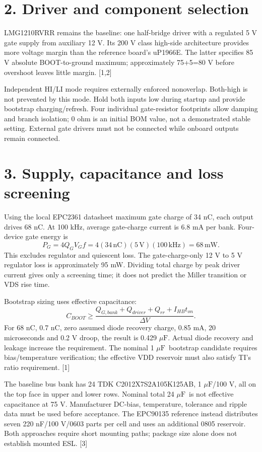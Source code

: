 \documentclass[10pt,a4paper]{article}
\newcommand{\uF}{\ensuremath{\mu\mathrm{F}}}
\begin{document}
\section*{2. Driver and component selection}
LMG1210RVRR remains the baseline: one half-bridge driver with a regulated 5 V gate supply from auxiliary 12 V. Its 200 V class high-side architecture provides more voltage margin than the reference board's uP1966E. The latter specifies 85 V absolute BOOT-to-ground maximum; approximately 75+5=80 V before overshoot leaves little margin. [1,2]

Independent HI/LI mode requires externally enforced nonoverlap. Both-high is not prevented by this mode. Hold both inputs low during startup and provide bootstrap charging/refresh. Four individual gate-resistor footprints allow damping and branch isolation; 0 ohm is an initial BOM value, not a demonstrated stable setting. External gate drivers must not be connected while onboard outputs remain connected.
\newpage
\section*{3. Supply, capacitance and loss screening}
Using the local EPC2361 datasheet maximum gate charge of 34 nC, each output drives 68 nC. At 100 kHz, average gate-charge current is 6.8 mA per bank. Four-device gate energy is
\[P_G=4Q_G V_G f=4(34\,\mathrm{nC})(5\,\mathrm{V})(100\,\mathrm{kHz})=68\,\mathrm{mW}.\]
This excludes regulator and quiescent loss. The gate-charge-only 12 V to 5 V regulator loss is approximately 95 mW. Dividing total charge by peak driver current gives only a screening time; it does not predict the Miller transition or VDS rise time.

Bootstrap sizing uses effective capacitance:
\[ C_{BOOT}\geq\frac{Q_{G,bank}+Q_{driver}+Q_{rr}+I_{HB}t_{on}}{\Delta V}. \]
For 68 nC, 0.7 nC, zero assumed diode recovery charge, 0.85 mA, 20 microseconds and 0.2 V droop, the result is 0.429 \uF. Actual diode recovery and leakage increase the requirement. The nominal 1 \uF\ bootstrap candidate requires bias/temperature verification; the effective VDD reservoir must also satisfy TI's ratio requirement. [1]

The baseline bus bank has 24 TDK C2012X7S2A105K125AB, 1 \uF/100 V, all on the top face in upper and lower rows. Nominal total 24 \uF\ is not effective capacitance at 75 V. Manufacturer DC-bias, temperature, tolerance and ripple data must be used before acceptance. The EPC90135 reference instead distributes seven 220 nF/100 V/0603 parts per cell and uses an additional 0805 reservoir. Both approaches require short mounting paths; package size alone does not establish mounted ESL. [3]
\end{document}
